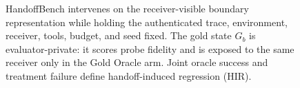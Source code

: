 \begin{figure}[t]
\caption{HandoffBench intervenes on the receiver-visible boundary
representation while holding the authenticated trace, environment, receiver,
tools, budget, and seed fixed. The gold state $G_b$ is evaluator-private: it
scores probe fidelity and is exposed to the same receiver only in the Gold
Oracle arm. Joint oracle success and treatment failure define handoff-induced
regression (HIR).}
\label{fig:handoffbench-overview}
\end{figure}
